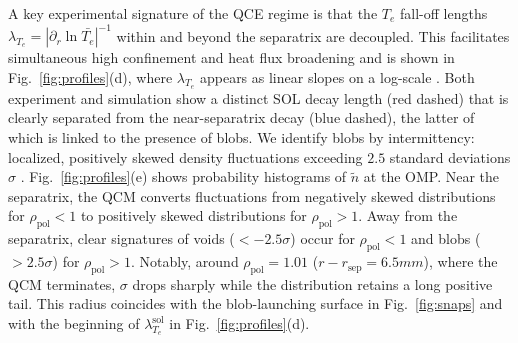\documentclass[aps,prl,twocolumn,superscriptaddress]{revtex4-2}
\def  \rpol {\rho_\mathrm{pol}}
\begin{document}
A key experimental signature of the QCE regime is that the $T_e$ fall-off lengths $\lambda_{T_e}=|\partial_r \ln \bar{T_e}|^{-1}$ within and beyond the separatrix are decoupled.
{This facilitates simultaneous high confinement and heat flux broadening} \cite{faitsch2021broadening} and is shown in Fig.~\ref{fig:profiles}(d), where $\lambda_{T_e}$ appears as linear slopes on a log-scale \cite{faitsch2021broadening,sun2015study}.
Both experiment and simulation show a distinct SOL decay length (red dashed) that is clearly separated from the near-separatrix decay (blue dashed), the latter of which is linked to the presence of blobs.
We identify blobs by intermittency: localized, positively skewed density fluctuations exceeding $2.5$ standard deviations $\sigma$ \cite{manz2015origin}.
Fig.~\ref{fig:profiles}(e) shows probability histograms of $\tilde{n}$ at the OMP.
Near the separatrix, the QCM converts fluctuations from negatively skewed distributions for $\rpol<1$ to positively skewed distributions for $\rpol>1$.
Away from the separatrix, clear signatures of voids ($<-2.5\sigma$) occur for $\rpol<1$ and blobs ($>2.5\sigma$) for $\rpol>1$.
Notably, around $\rpol=1.01$ ($r-r_{\mathrm{sep}}=6.5\si{mm}$), where the QCM terminates, $\sigma$ drops sharply while the distribution retains a long positive tail.
This radius coincides with the blob-launching surface in Fig.~\ref{fig:snaps} and with the beginning of $\lambda_{T_e}^{\mathrm{sol}}$ in Fig.~\ref{fig:profiles}(d).
\end{document}
